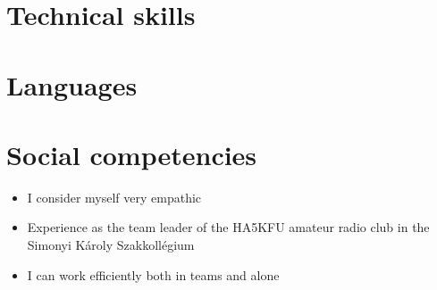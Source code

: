 \section*{Technical skills}
\section*{Languages}
    \hspace{1cm}
    \hfill
    \hfill
    \hspace{1cm}
\section*{Social competencies}
    \begin{itemize} \setlength\itemsep{0.5ex}
        \item I consider myself very empathic
        \item Experience as the team leader of the HA5KFU amateur radio club in the Simonyi Károly Szakkollégium
        \item I can work efficiently both in teams and alone
    \end{itemize}
